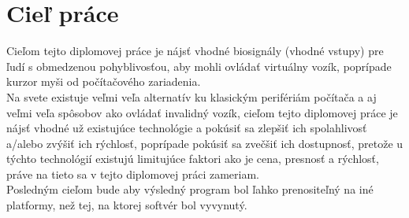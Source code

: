 \chapter{Cieľ práce}
\tab [5 mm] Cieľom tejto diplomovej práce je nájsť vhodné biosignály (vhodné vstupy) pre ľudí s obmedzenou pohyblivosťou, aby mohli ovládať virtuálny vozík, poprípade kurzor myši od počítačového zariadenia. \\
\tab[5 mm] Na svete existuje veľmi veľa alternatív ku klasickým perifériám počítača a aj veľmi veľa spôsobov ako ovládať invalidný vozík, cieľom tejto diplomovej práce je nájsť vhodné už existujúce technológie a pokúsiť sa zlepšiť ich spolahlivosť a/alebo zvýšiť ich rýchlosť, poprípade pokúsiť sa zvečšiť ich dostupnosť, pretože u týchto technológií existujú limitujúce faktori ako je cena, presnosť a rýchlosť, práve na tieto sa v tejto diplomovej práci zameriam.\\
\tab[5 mm] Posledným cieľom bude aby výsledný program bol ľahko prenositeľný na iné platformy, než tej, na ktorej softvér bol vyvynutý.